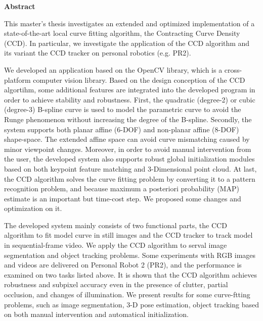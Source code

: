 

\clearemptydoublepage
{}
{}        





\vspace*{2cm}
\begin{center}
{\Large \bf Abstract}
\end{center}
\vspace{1cm}

This master's thesis investigates an extended and optimized
implementation of a state-of-the-art local curve fitting algorithm,
the Contracting Curve Density (CCD).
In particular, we investigate
the application of the CCD algorithm and its variant the CCD tracker
on personal robotics (e.g. PR2).

We developed an application based on the OpenCV library, which
is a cross-platform computer vision library. Based on the
design conception of the CCD algortihm, some
additional features are integrated into the developed program in order to
achieve stability and robustness. First, the quadratic (degree-2) or
cubic (degree-3) B-spline curve is used to model the parametric curve
to avoid the Runge phenomenon without increasing the degree of the
B-spline. Secondly, the system supports both planar affine (6-DOF) and
non-planar affine (8-DOF) shape-space. The extended affine space can avoid
curve mismatching caused by minor viewpoint changes. Moreover, in
order to avoid manual intervention from the user, the developed system
also supports robust global initialization modules based on both keypoint
feature matching and 3-Dimensional point cloud. At last, the CCD
algorithm solves the curve fitting problem by converting it to a
pattern recognition problem, and because maximum a posteriori probability
(MAP) estimate is an important but time-cost step. We proposed some
changes and optimization on it.

The developed system mainly consists of two functional parts, the CCD
algorithm to fit model curve in still images and the CCD tracker to
track model in sequential-frame video. We apply the CCD algorithm to
serval image segmentation and object tracking problems. Some experiments with RGB
images and videos are delivered on Personal Robot 2 (PR2), and the
performance is examined on two tasks listed above.  It is shown that
the CCD algorithm achieves robustness and subpixel accuracy even in the
presence of clutter, partial occlusion, and changes of
illumination. We present results for some curve-ftting problems, such
as image segmentation, 3-D pose estimation, object tracking based on
both manual intervention and automatical initialization.

















